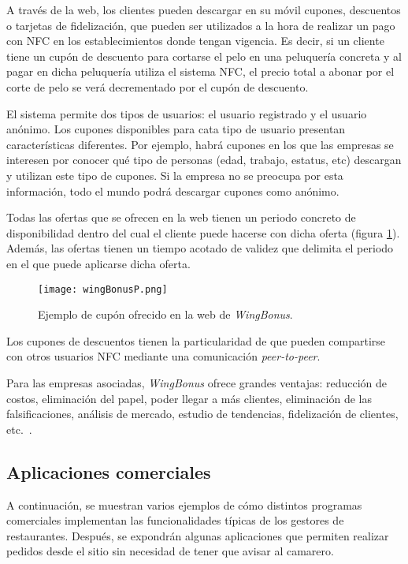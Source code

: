   A través de la web, los clientes pueden descargar en su móvil cupones, 
  descuentos o tarjetas de fidelización, que pueden ser utilizados a la hora 
  de realizar un pago con \acs{NFC} en los establecimientos donde tengan 
  vigencia. Es decir, si un cliente tiene un cupón de descuento para cortarse 
  el pelo en una peluquería concreta y al pagar en dicha peluquería utiliza el 
  sistema \acs{NFC}, el precio total a abonar por el corte de pelo se verá 
  decrementado por el cupón de descuento.

  El sistema permite dos tipos de usuarios: el usuario registrado y el usuario
  anónimo. Los cupones disponibles para cata tipo de usuario presentan
  características diferentes. Por ejemplo, habrá cupones en los que las
  empresas se interesen por conocer qué tipo de personas (edad, trabajo,
  estatus, etc) descargan y utilizan este tipo de cupones. Si la empresa no
  se preocupa por esta información, todo el mundo podrá descargar cupones
  como anónimo.

  Todas las ofertas que se ofrecen en la web tienen un periodo concreto de
  disponibilidad dentro del cual el cliente puede hacerse con dicha oferta
  (figura \ref{fig:wingBonusP}). Además, las ofertas tienen un tiempo acotado
  de validez que delimita el periodo en el que puede aplicarse dicha oferta.

  \begin{figure}[!h]
    \begin{center}
      \texttt{[image: wingBonusP.png]}
      \caption{Ejemplo de cupón ofrecido en la web de \emph{WingBonus}.}
      \label{fig:wingBonusP}
    \end{center}
  \end{figure}

  Los cupones de descuentos tienen la particularidad de que pueden compartirse
  con otros usuarios \acs{NFC} mediante una comunicación \emph{peer-to-peer}.

  Para las empresas asociadas, \emph{WingBonus} ofrece grandes ventajas: 
  reducción de costos, eliminación del papel, poder llegar a más clientes,
  eliminación de las falsificaciones, análisis de mercado, estudio de
  tendencias, fidelización de clientes, etc.~\cite{bib:wingBonus}.

  \subsection{Aplicaciones comerciales}
  A continuación, se muestran varios ejemplos de cómo distintos programas
  comerciales implementan las funcionalidades típicas de los gestores de
  restaurantes. Después, se expondrán algunas aplicaciones que permiten
  realizar pedidos desde el sitio sin necesidad de tener que avisar al
  camarero.

